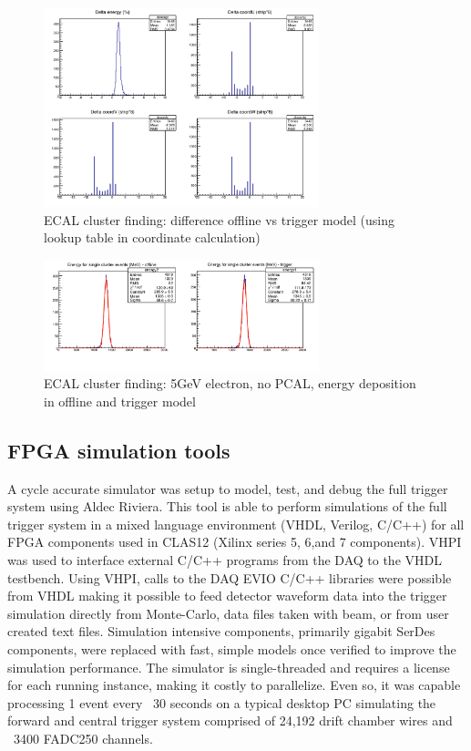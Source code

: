\begin{figure}[htp]
	\begin{center}
		\centering
		\includegraphics[width=8cm]{img/ecal_sim2.png}
		\caption{ECAL cluster finding: difference offline vs trigger model (using lookup table in coordinate calculation)}
		\label{fig:ecal_sim2}
	\end{center}
\end{figure} 

\begin{figure}[htp]
	\begin{center}
		\centering
		\includegraphics[width=8cm]{img/ecal_sim3.png}
		\caption{ECAL cluster finding: 5GeV electron, no PCAL, energy deposition in offline and trigger model}
		\label{fig:ecal_sim3}
	\end{center}
\end{figure} 


\subsection{FPGA simulation tools}

A cycle accurate simulator was setup to model, test, and debug the full trigger system using Aldec Riviera. This tool is able to perform simulations of the full trigger system in a mixed language environment (VHDL, Verilog, C/C++) for all FPGA components used in CLAS12 (Xilinx series 5, 6,and 7 components). VHPI was used to interface external C/C++ programs from the DAQ to the VHDL testbench. Using VHPI, calls to the DAQ EVIO C/C++ libraries were possible from VHDL making it possible to feed detector waveform data into the trigger simulation directly from Monte-Carlo, data files taken with beam, or from user created text files. Simulation intensive components, primarily gigabit SerDes components, were replaced with fast, simple models once verified to improve the simulation performance. The simulator is single-threaded and requires a license for each running instance, making it costly to parallelize. Even so, it was capable processing 1 event every ~30 seconds on a typical desktop PC simulating the forward and central trigger system comprised of 24,192 drift chamber wires and ~3400 FADC250 channels.


